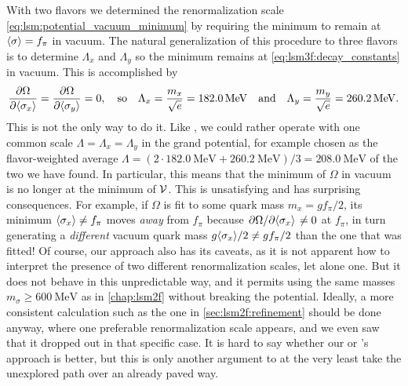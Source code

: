 With two flavors we determined the renormalization scale \eqref{eq:lsm:potential_vacuum_minimum} by requiring the minimum to remain at $\langle \sigma \rangle=f_\pi$ in vacuum.
The natural generalization of this procedure to three flavors is to determine $\Lambda_x$ and $\Lambda_y$ so the minimum remains at \eqref{eq:lsm3f:decay_constants} in vacuum.
This is accomplished by
\begin{equation}
	\pdv{\Omega}{ \langle \sigma_x \rangle} = \pdv{\Omega}{ \langle \sigma_y \rangle} = 0,
	\quad \text{so}
	\quad \Lambda_x = \frac{m_x}{\sqrt{e}} = \SI{182.0}{\mega\electronvolt}
	\quad \text{and} \quad
	\Lambda_y = \frac{m_y}{\sqrt{e}} = \SI{260.2}{\mega\electronvolt}.
\end{equation}
This is not the only way to do it.
Like \cite{ref:master_berge},
we could rather operate with one common scale $\Lambda = \Lambda_x = \Lambda_y$ in the grand potential,
for example chosen as the flavor-weighted average $\Lambda = (2 \cdot \SI{182.0}{\mega\electronvolt} + \SI{260.2}{\mega\electronvolt}) / 3 = \SI{208.0}{\mega\electronvolt}$ of the two we have found.
In particular, this means that the minimum of $\Omega$ in vacuum is no longer at the minimum of $\mathcal{V}$.
This is unsatisfying and has surprising consequences.
For example, if $\Omega$ is fit to some quark mass $m_x = g f_\pi /2$,
its minimum $\langle \sigma_x \rangle \neq f_\pi$ moves \emph{away} from $f_\pi$ because $\pdv{\Omega}/{\langle \sigma_x \rangle} \neq 0$ at $f_\pi$,
in turn generating a \emph{different} vacuum quark mass $g \langle \sigma_x \rangle / 2 \neq g f_\pi / 2$ than the one that was fitted!
Of course, our approach also has its caveats, as it is not apparent how to interpret the presence of two different renormalization scales, let alone one.
But it does not behave in this unpredictable way, and it permits using the same masses $m_\sigma \geq \SI{600}{\mega\electronvolt}$ as in \cref{chap:lsm2f} without breaking the potential.
Ideally, a more consistent calculation such as the one in \cref{sec:lsm2f:refinement} should be done anyway,
where one preferable renormalization scale appears, and we even saw that it dropped out in that specific case.
It is hard to say whether our or \cite{ref:master_berge}'s approach is better,
but this is only another argument to at the very least take the unexplored path over an already paved way.

